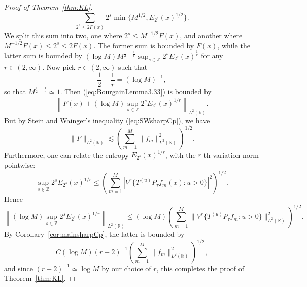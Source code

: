 \documentclass[12pt,leqno]{amsart}
\def\R{\mathbb{R}}
\def\Z{\mathbb{Z}}
\theoremstyle{plain}
\numberwithin{equation}{section}
\begin{document}
\begin{proof}[Proof of Theorem~\ref{thm:KL}]
$$
\sum_{2^s \leq 2F(x)} 2^s \min \{ M^{1/2}, E_{2^s}(x)^{1/2} \}.
$$
We split this sum into two, one where $2^s \leq M^{-1/2} F(x)$, and another where $M^{-1/2} F(x) \leq 2^s \leq 2 F(x)$. The former sum is bounded by $F(x)$, while the latter sum is bounded by $(\log M) M^{\frac{1}{2}-\frac{1}{r}} \sup_{s \in \Z} 2^s E_{2^s}(x)^{\frac{1}{r}}$ for any $r \in (2,\infty)$. Now pick $r \in (2,\infty)$ such that $$\frac{1}{2} - \frac{1}{r} = (\log M)^{-1},$$ so that $M^{\frac{1}{2}-\frac{1}{r}} \simeq 1$. Then (\ref{eq:BourgainLemma3.33}) is bounded by
$$
\left \| F(x)  + (\log M) \sup_{s \in \Z} 2^s E_{2^s}(x)^{1/r} \right \|_{L^2(\R)}.
$$
But by Stein and Wainger's inequality (\ref{eq:SWsharpCp}), we have
$$
\|F \|_{L^2(\R)} \lesssim  \left ( \sum_{m=1}^M \|f_m\|_{L^2(\R)}^2 \right )^{1/2}.
$$
Furthermore, one can relate the entropy $E_{2^s}(x)^{1/r}$, with the $r$-th variation norm pointwise:
$$
\sup_{s \in \Z} 2^s E_{2^s}(x)^{1/r} \leq \left( \sum_{m=1}^M |V^r \{T^{(u)} P_{\tau} f_m(x) \colon u > 0\} |^2 \right)^{1/2}.
$$
Hence
$$
\left \|(\log M) \sup_{s \in \Z} 2^s E_{2^s}(x)^{1/r} \right \|_{L^2(\R)}
\leq (\log M) \left( \sum_{m=1}^M \|V^r \{T^{(u)} P_{\tau} f_m \colon u > 0\} \|_{L^2(\R)}^2 \right)^{1/2}.
$$
By Corollary~\ref{cor:mainsharpCp}, the latter is bounded by
$$
C (\log M) (r-2)^{-1} \left ( \sum_{m=1}^M \|f_m\|_{L^2(\R)}^2 \right )^{1/2},
$$
and since $(r-2)^{-1} \simeq \log M$ by our choice of $r$, this completes the proof of Theorem~\ref{thm:KL}.
\end{proof}
\end{document}
